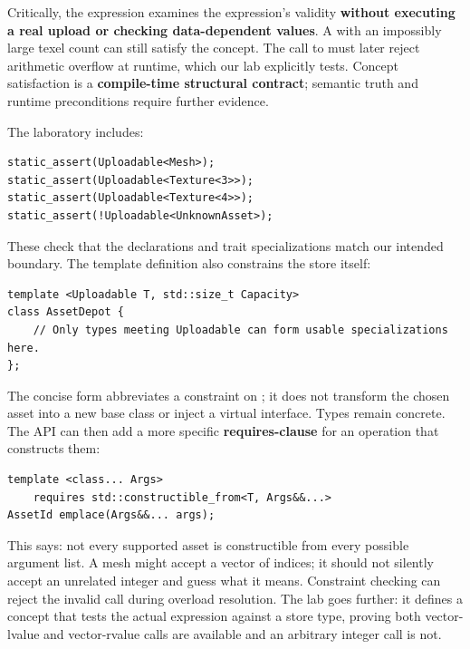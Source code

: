 Critically, the  expression examines the expression's validity \textbf{without executing a real upload or checking data-dependent values}. A  with an impossibly large texel count can still satisfy the concept. The call to  must later reject arithmetic overflow at runtime, which our lab explicitly tests. Concept satisfaction is a \textbf{compile-time structural contract}; semantic truth and runtime preconditions require further evidence.

The laboratory includes:

\begin{verbatim}
static_assert(Uploadable<Mesh>);
static_assert(Uploadable<Texture<3>>);
static_assert(Uploadable<Texture<4>>);
static_assert(!Uploadable<UnknownAsset>);
\end{verbatim}

These check that the declarations and trait specializations match our intended boundary. The template definition also constrains the store itself:

\begin{verbatim}
template <Uploadable T, std::size_t Capacity>
class AssetDepot {
    // Only types meeting Uploadable can form usable specializations here.
};
\end{verbatim}

The concise  form abbreviates a constraint on ; it does not transform the chosen asset into a new base class or inject a virtual interface. Types remain concrete. The API can then add a more specific \textbf{requires-clause} for an operation that constructs them:

\begin{verbatim}
template <class... Args>
    requires std::constructible_from<T, Args&&...>
AssetId emplace(Args&&... args);
\end{verbatim}

This says: not every supported asset is constructible from every possible argument list. A mesh might accept a vector of indices; it should not silently accept an unrelated integer and guess what it means. Constraint checking can reject the invalid call during overload resolution. The lab goes further: it defines a  concept that tests the actual expression against a store type, proving both vector-lvalue and vector-rvalue calls are available and an arbitrary integer call is not.

